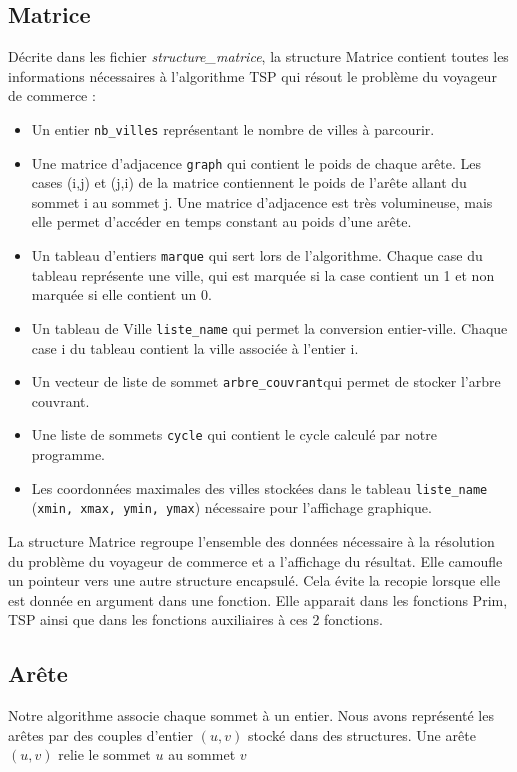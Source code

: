 \documentclass[a4paper,11pt]{article}
\begin{document}
\subsection{Matrice} %
Décrite dans les fichier \emph{structure\_matrice}, la structure \textsf{Matrice} contient toutes les informations nécessaires à l'algorithme TSP qui résout le problème du voyageur de commerce :
\begin{itemize}
\renewcommand{\FrenchLabelItem}{\textbullet}
\item Un entier \texttt{nb\_villes} représentant le nombre de villes à parcourir.
\item Une matrice d'adjacence \texttt{graph} qui contient le poids de chaque arête. Les cases (i,j) et (j,i) de la matrice contiennent le poids de l'arête allant du sommet i au sommet j. Une matrice d'adjacence est très volumineuse, mais elle permet d'accéder en temps constant au poids d'une arête.
\item Un tableau d'entiers \texttt{marque} qui sert lors de l'algorithme. Chaque case du tableau représente une ville, qui est marquée si la case contient un 1 et non marquée si elle contient un 0.
\item Un tableau de \textsf{Ville} \texttt{liste\_name} qui permet la conversion entier-ville. Chaque case i du tableau contient la ville associée à l'entier i.
\item Un vecteur de liste de sommet \texttt{arbre\_couvrant}qui permet de stocker l'arbre couvrant.
\item Une liste de sommets \texttt{cycle} qui contient le cycle calculé par notre programme.
\item Les coordonnées maximales des villes stockées dans le tableau \texttt{liste\_name} (\texttt{xmin, xmax, ymin, ymax}) nécessaire pour l'affichage graphique.
\end{itemize}

La structure Matrice regroupe l'ensemble des données nécessaire à la résolution du problème du voyageur de commerce et a l'affichage du résultat.
Elle camoufle un pointeur vers une autre structure encapsulé. Cela évite la recopie lorsque elle est donnée en argument dans une fonction. Elle apparait dans les fonctions Prim, TSP ainsi que dans les fonctions auxiliaires à ces 2 fonctions.\\

\subsection{Arête}
Notre algorithme associe chaque sommet à un entier. Nous avons représenté les arêtes par des couples d'entier $(u, v)$ stocké dans des structures. Une arête $(u, v)$ relie le sommet $u$ au sommet $v$
\end{document}
